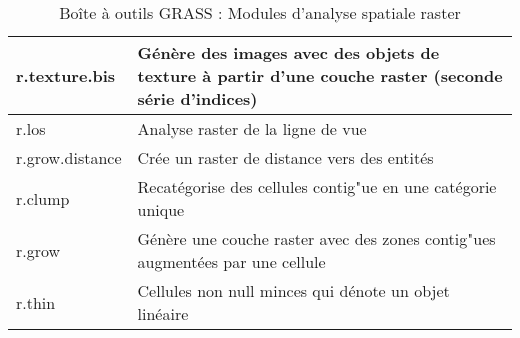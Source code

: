 \begin{table}[H]
\begin{tabular}{|p{4cm}|p{10cm}|}
  \hline r.texture.bis & Génère des images avec des objets de texture à partir d'une couche raster (seconde série d'indices)\\
  \hline r.los & Analyse raster de la ligne de vue\\
  \hline r.grow.distance & Crée un raster de distance vers des entités \\
  \hline r.clump & Recatégorise des cellules contig"ue en une catégorie unique \\
  \hline r.grow & Génère une couche raster avec des zones contig"ues augmentées par une cellule\\
  \hline r.thin & Cellules non null minces qui dénote un objet linéaire \\
\hline
\end{tabular}
\caption{Boîte à outils GRASS : Modules d'analyse spatiale raster}
\end{table}

